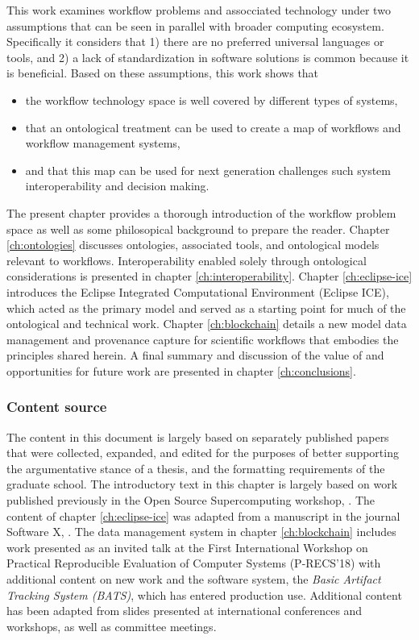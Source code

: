 This work examines workflow problems and assocciated technology under two
assumptions that can be seen in parallel with broader
computing ecosystem. Specifically it considers that 1) there are no preferred
universal languages or tools, and 2) a lack of standardization
in software solutions is common because it is beneficial. Based
on these assumptions, this work shows that 
\begin{itemize}
  \item the workflow technology space is well covered by different types
  of systems,
  \item that an ontological treatment can be used to create a map of
  workflows and workflow management systems,
  \item and that this map can be used for next generation
  challenges such system interoperability and decision making.
\end{itemize}

The present chapter provides a thorough introduction of the workflow problem
space as well as some philosopical background to prepare the reader. Chapter
\ref{ch:ontologies} discusses ontologies, associated tools, and ontological
models relevant to workflows. Interoperability enabled solely through
ontological considerations is presented in chapter
\ref{ch:interoperability}. Chapter \ref{ch:eclipse-ice} introduces the
Eclipse Integrated Computational Environment (Eclipse ICE), which acted as the
primary model and served as a starting point for much of the
ontological and technical work. Chapter \ref{ch:blockchain} details a new model
data management and provenance capture for scientific workflows that embodies
the principles shared herein. A final summary and discussion of the
value of and opportunities for future work are presented in chapter
\ref{ch:conclusions}.

\subsubsection{Content source}

The content in this document is largely based on separately published papers
that were collected, expanded, and edited for the purposes of better supporting
the argumentative stance of a thesis, and the formatting requirements of
the graduate school. The introductory text in this chapter is largely based on
work published previously in the Open Source Supercomputing workshop,
\cite{billings_toward_2017}. The content of chapter \ref{ch:eclipse-ice} was
adapted from a manuscript in the journal Software X,
\cite{billings_eclipse_2017}. The data management system in chapter
\ref{ch:blockchain} includes work presented as an invited talk at the First
International Workshop on Practical Reproducible Evaluation of Computer Systems
(P-RECS'18) with additional content on new work and the software system, the
\textit{Basic Artifact Tracking System (BATS)}, which has entered production
use. Additional content has been adapted from slides presented at international
conferences and workshops, as well as committee meetings.

